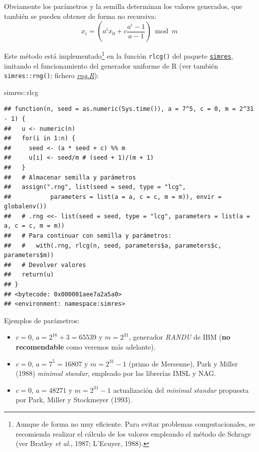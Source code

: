 \documentclass[
]{book}
\newenvironment{Shaded}{\begin{snugshade}}{\end{snugshade}}
\newcommand{\NormalTok}[1]{#1}
\newcommand{\SpecialCharTok}[1]{\textcolor[rgb]{0.00,0.00,0.00}{#1}}
\theoremstyle{break}
\theoremstyle{nonumberplain}
\begin{document}
Obviamente los parámetros y la semilla determinan los valores generados, que también se pueden obtener de forma no recursiva:
\[x_{i}=\left( a^{i}x_0+c\frac{a^{i}-1}{a-1}\right) \bmod m\]

Este método está implementado\footnote{Aunque de forma no muy eficiente. Para evitar problemas computacionales, se recomienda realizar el cálculo de los valores empleando el método de Schrage (ver Bratley \emph{et al.}, 1987; L'Ecuyer, 1988).} en la función \texttt{rlcg()} del paquete \href{https://rubenfcasal.github.io/simres}{\texttt{simres}}, imitando el funcionamiento del generador uniforme de R (ver también \texttt{simres::rng()}; fichero \href{R/rng.R}{\emph{rng.R}}):

\begin{Shaded}
\begin{Highlighting}[]
\NormalTok{simres}\SpecialCharTok{::}\NormalTok{rlcg}
\end{Highlighting}
\end{Shaded}

\begin{verbatim}
## function(n, seed = as.numeric(Sys.time()), a = 7^5, c = 0, m = 2^31 - 1) {
##   u <- numeric(n)
##   for(i in 1:n) {
##     seed <- (a * seed + c) %% m
##     u[i] <- seed/m # (seed + 1)/(m + 1)
##   }
##   # Almacenar semilla y parámetros
##   assign(".rng", list(seed = seed, type = "lcg",
##           parameters = list(a = a, c = c, m = m)), envir = globalenv())
##   # .rng <<- list(seed = seed, type = "lcg", parameters = list(a = a, c = c, m = m))
##   # Para continuar con semilla y parámetros:
##   #   with(.rng, rlcg(n, seed, parameters$a, parameters$c, parameters$m))
##   # Devolver valores
##   return(u)
## }
## <bytecode: 0x000001aee7a2a5a0>
## <environment: namespace:simres>
\end{verbatim}

Ejemplos de parámetros:

\begin{itemize}
\item
  \(c=0\), \(a=2^{16}+3=65539\) y \(m=2^{31}\), generador \emph{RANDU} de IBM
  (\textbf{no recomendable} como veremos más adelante).
\item
  \(c=0\), \(a=7^{5}=16807\) y \(m=2^{31}-1\) (primo de Mersenne), Park y Miller (1988)
  \emph{minimal standar}, empleado por las librerías IMSL y NAG.
\item
  \(c=0\), \(a=48271\) y \(m=2^{31}-1\) actualización del \emph{minimal standar}
  propuesta por Park, Miller y Stockmeyer (1993).
\end{itemize}
\end{document}
